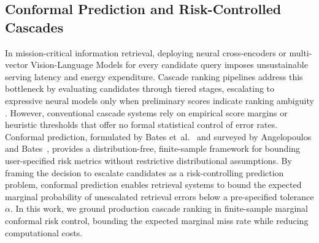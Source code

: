 \documentclass[conference]{IEEEtran}
\begin{document}
\subsection{Conformal Prediction and Risk-Controlled Cascades}
In mission-critical information retrieval, deploying neural cross-encoders or multi-vector Vision-Language Models for every candidate query imposes unsustainable serving latency and energy expenditure. Cascade ranking pipelines address this bottleneck by evaluating candidates through tiered stages, escalating to expressive neural models only when preliminary scores indicate ranking ambiguity \cite{wang2011cascade, gallagher2019cascade}. However, conventional cascade systems rely on empirical score margins or heuristic thresholds that offer no formal statistical control of error rates. Conformal prediction, formulated by Bates et~al.~\cite{bates2021conformal} and surveyed by Angelopoulos and Bates~\cite{angelopoulos2021gentle}, provides a distribution-free, finite-sample framework for bounding user-specified risk metrics without restrictive distributional assumptions. By framing the decision to escalate candidates as a risk-controlling prediction problem, conformal prediction enables retrieval systems to bound the expected marginal probability of unescalated retrieval errors below a pre-specified tolerance $\alpha$. In this work, we ground production cascade ranking in finite-sample marginal conformal risk control, bounding the expected marginal miss rate while reducing computational costs.
\end{document}

